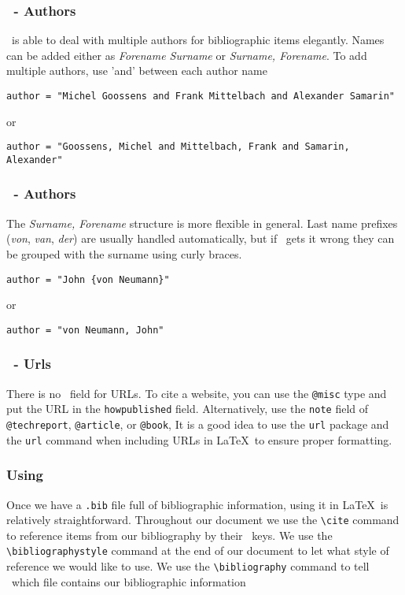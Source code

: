 \documentclass[mathserif]{beamer}
\begin{document}
\begin{frame}[fragile]
\frametitle{\BibTeX\ - Authors}
\vfill
\BibTeX\ is able to deal with multiple authors for bibliographic items elegantly. 
\vfill
Names can be added either as \emph{Forename Surname} or \emph{Surname, Forename}.
\vfill
To add multiple authors, use 'and' between each author name
\begin{lstlisting}[style=latexsty]
	author = "Michel Goossens and Frank Mittelbach and Alexander Samarin"
\end{lstlisting}
\vfill
or
\vfill
\begin{lstlisting}[style=latexsty]
	author = "Goossens, Michel and Mittelbach, Frank and Samarin, Alexander"
\end{lstlisting}
\vfill
\end{frame}


\begin{frame}[fragile]
\frametitle{\BibTeX\ - Authors}
\vfill
The \emph{Surname, Forename} structure is more flexible in general.
\vfill
Last name prefixes (\emph{von}, \emph{van}, \emph{der}) are usually handled automatically, but if \BibTeX\ gets it wrong they can be grouped with the surname using curly braces.
\begin{lstlisting}[style=latexsty]
	author = "John {von Neumann}"
\end{lstlisting}
\vfill
or
\vfill
\begin{lstlisting}[style=latexsty]
	author = "von Neumann, John"
\end{lstlisting}
\vfill
\end{frame}


\begin{frame}[fragile]
\frametitle{\BibTeX\ - Urls}
\vfill
There is no \BibTeX\ field for URLs. To cite a website, you can use the \texttt{@misc} type and put the URL in the \texttt{howpublished} field. Alternatively, use the \texttt{note} field of \texttt{@techreport}, \texttt{@article}, or \texttt{@book}, 
\vfill
It is a good idea to use the \texttt{url} package and the \texttt{url} command when including URLs in \LaTeX\ to ensure proper formatting.
\vfill
\end{frame}


\begin{frame}[fragile]
\frametitle{Using \BibTeX}

\vfill
Once we have a \texttt{.bib} file full of bibliographic information, using it in \LaTeX\ is relatively straightforward.
\vfill
Throughout our document we use the \texttt{{\textbackslash}cite} command to reference items from our bibliography by their \BibTeX\ keys.
\vfill
We use the \texttt{{\textbackslash}bibliographystyle} command at the end of our document to let \BibTeX what style of reference we would like to use.
\vfill
We use the \texttt{{\textbackslash}bibliography} command to tell \BibTeX\ which file contains our bibliographic information
\vfill
\end{frame}
\end{document}
